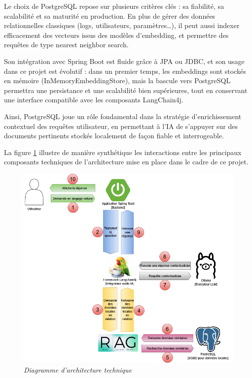 \documentclass[12pt,a4paper]{report}
\begin{document}
\begin{itemize}
		Le choix de PostgreSQL repose sur plusieurs critères clés : sa fiabilité, sa scalabilité et sa maturité en production. En plus de gérer des données relationnelles classiques (logs, utilisateurs, paramètres…), il peut aussi indexer efficacement des vecteurs issus des modèles d’embedding, et permettre des requêtes de type nearest neighbor search.
		
		Son intégration avec Spring Boot est fluide grâce à JPA ou JDBC, et son usage dans ce projet est évolutif : dans un premier temps, les embeddings sont stockés en mémoire (InMemoryEmbeddingStore), mais la bascule vers PostgreSQL permettra une persistance et une scalabilité bien supérieures, tout en conservant une interface compatible avec les composants LangChain4j.
		
		Ainsi, PostgreSQL joue un rôle fondamental dans la stratégie d’enrichissement contextuel des requêtes utilisateur, en permettant à l’IA de s’appuyer sur des documents pertinents stockés localement de façon fiable et interrogeable.
		
	\end{itemize}
	
	La figure \ref{fig:illustration-graphique} illustre de manière synthétique les interactions entre les principaux composants techniques de l’architecture mise en place dans le cadre de ce projet.
	
	\begin{figure}[H]
		\centering
		\includegraphics[width=1\textwidth]{illustration-graphique.drawio.png}
		\caption{\textit{Diagramme d'architecture technique}}
		\label{fig:illustration-graphique}
	\end{figure}
	
\end{document}
